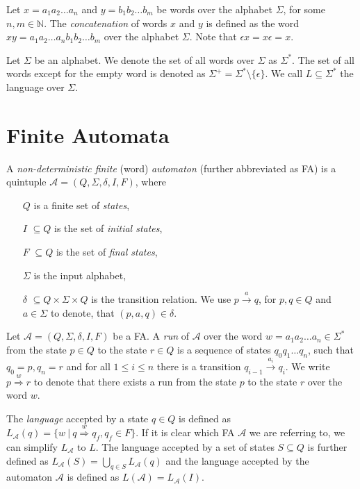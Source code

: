 Let $x = a_1a_2\ldots a_n$ and $y = b_1b_2\ldots b_m$ be words over the alphabet $\Sigma$, for some $n, m \in \mathbb{N}$. The \emph{concatenation} of words $x$ and $y$ is defined as the word $xy = a_1a_2\ldots a_nb_1b_2\ldots b_m$ over the alphabet $\Sigma$. Note that $\epsilon x = x \epsilon = x$. 

Let $\Sigma$ be an alphabet. We denote the set of all words over $\Sigma$ as $\Sigma^*$. The set of all words except for the empty word is denoted as $\Sigma^+ = \Sigma^* \setminus \{\epsilon\}$. We call $L \subseteq \Sigma^*$ the language over $\Sigma$.

 \section{Finite Automata}

 A \emph{non-deterministic finite} (word) \emph{automaton} (further abbreviated as FA) is a quintuple $\mathcal{A} = (Q, \Sigma, \delta, I, F)$, where
  \begin{itemize}
	 \item[$Q$] is a finite set of \emph{states},
	 \item[$I$] $ \subseteq Q$ is the set of \emph{initial states},
	 \item[$F$] $ \subseteq Q$ is the set of \emph{final states},
	 \item[$\Sigma$] is the input alphabet,
	 \item[$\delta$] $ \subseteq Q \times\Sigma\times Q$ is the transition relation. We use $p \overset{a}{\longrightarrow} q$, for $p, q \in Q$ and $a \in \Sigma$ to denote, that $(p, a, q) \in \delta$.
	\end{itemize}
	
		Let $\mathcal{A} = (Q, \Sigma, \delta, I, F)$ be a FA. A \emph{run} of $\mathcal{A}$ over the word $w = a_1a_2\ldots a_n \in \Sigma^*$ from the state $p \in Q$ to the state $r \in Q$ is a sequence of states $q_0q_1\ldots q_n$, such that $q_0 = p, q_n = r$ and for all $1 \leq i \leq n$ there is a transition $q_{i-1} \overset{a_i}{\longrightarrow} q_i$. We write $p \overset{w}{\Longrightarrow} r$ to denote that there exists a run from the state $p$ to the state $r$ over the word $w$.
	
	The \emph{language} accepted by a state $q \in Q$ is defined as $L_{\mathcal{A}}(q) = \{w\ |\ q \overset{w}{\Longrightarrow} q_f, q_f \in F\}$. If it is clear which FA $\mathcal{A}$ we are referring to, we can simplify $L_{\mathcal{A}}$ to $L$. The language accepted by a set of states $S \subseteq Q$ is further defined as $L_{\mathcal{A}}(S) = \bigcup_{q \in S} L_{\mathcal{A}}(q)$ and the language accepted by the automaton $\mathcal{A}$ is defined as $L(\mathcal{A}) = L_{\mathcal{A}}(I)$.
	
